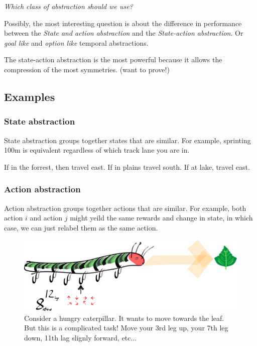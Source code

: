 \begin{displayquote}
\textit{Which class of abstraction should we use?}
\end{displayquote}

Possibly, the most interesting question is about the difference in performance between
the \textit{State and action abstraction} and the \textit{State-action abstraction}.
Or \textit{goal like} and \textit{option like} temporal abstractions.

The state-action abstraction is the most powerful because it allows the compression of the most symmetries. (want to
prove!)

\subsection{Examples}

\subsubsection{State abstraction}

State abstraction groups together states that are similar. For example,
sprinting 100m is equivalent regardless of which track lane you are in.

If in the forrest, then travel east. If in plains travel south. If at lake, travel east.


\subsubsection{Action abstraction}

Action abstraction groups together actions that are similar. For
example, both action $i$ and action $j$ might yeild the same rewards and change in state,
in which case, we can just relabel them as the same action.

\begin{figure}[h!]
\centering
\includegraphics[width=\textwidth,height=0.25\textheight]{../../pictures/drawings/hungry-caterpillar.png}
\caption{Consider a hungry caterpillar. It wants to move towards the leaf. But this is a complicated task! Move your 3rd leg up, your 7th leg down, 11th lag slignly forward, etc...}
\end{figure}


